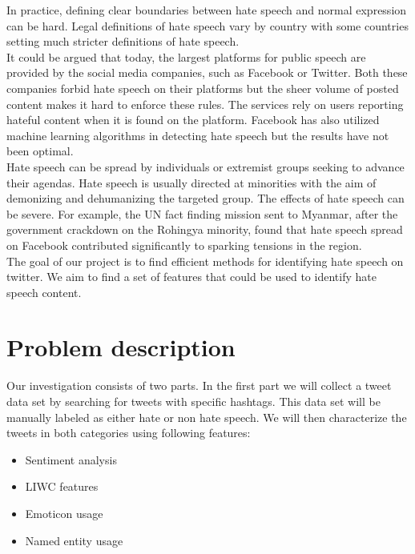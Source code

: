 \documentclass[conference]{IEEEtran}
\begin{document}
In practice, defining clear boundaries between hate speech and normal expression can be
hard. Legal definitions of hate speech vary by country with some countries setting much
stricter definitions of hate speech. \cite{Wikipedia:hate_speech_laws}
\\
It could be argued that today, the largest platforms for public speech are provided by 
the social media companies, such as Facebook or Twitter. Both these companies forbid 
hate speech on their platforms \cite{Twitter:hate_speech,Facebook:hate_speech} but the sheer volume 
of posted content makes it hard to enforce these rules. The services rely on users reporting
hateful content when it is found on the platform. Facebook has also utilized machine learning
algorithms in detecting hate speech but the results have not been optimal. \cite{Time:facebook_hate_speech_languages}
\\
Hate speech can be spread by individuals or extremist groups seeking to advance their 
agendas. Hate speech is usually directed at minorities with the aim of demonizing and 
dehumanizing the targeted group. The effects of hate speech can be severe. For example, the 
UN fact finding mission sent to Myanmar, after the government crackdown on the Rohingya 
minority, found that hate speech spread on Facebook contributed significantly to sparking 
tensions in the region\cite{Reuters:myanmar_rohingya}.
\\
The goal of our project is to find efficient methods for identifying hate speech on twitter.
We aim to find a set of features that could be used to identify hate speech content. 

\section{Problem description}
Our investigation consists of two parts. In the first part we will collect a tweet data set by searching 
for tweets with specific hashtags. This data set will be manually labeled as either hate or 
non hate speech. We will then characterize the tweets in both categories using following features:

\begin{itemize}
    \item Sentiment analysis
    \item LIWC features
    \item Emoticon usage
    \item Named entity usage
\end{itemize}
\end{document}

